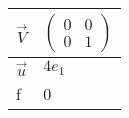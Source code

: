 \begin{table}[H]
    \centering
    \begin{tabular}{|l|l|}
    \hline
      $\vec{V}$   & $\begin{pmatrix}0&0\\0&1\end{pmatrix}$ \\
      \hline
      $\vec{u}$   & $4e_1$ \\
      \hline
      f   & 0 \\
      \hline
    \end{tabular}
    \label{tab:tables/table2.tex}
\end{table}